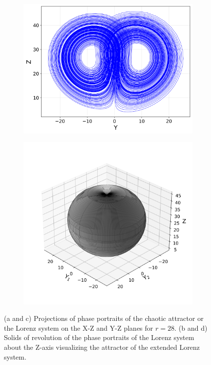 \documentclass[paper=a4, fontsize=11pt]{scrartcl}
\numberwithin{equation}{section}		%
\numberwithin{figure}{section}			%
\numberwithin{table}{section}				%
\begin{document}
\begin{figure}[hbt!]
\begin{subfigure}[b]{0.495\textwidth}
		\caption{}
		\label{fig:sub2}
	\end{subfigure}
	\hfill
	\begin{subfigure}[b]{0.495\textwidth}
		\centering
		\includegraphics[width=\textwidth]{media/lorenz_yz_projection.png}
		\caption{}
		\label{fig:sub1}
	\end{subfigure}
	\hfill
	\begin{subfigure}[b]{0.495\textwidth}
		\centering
		\includegraphics[width=\textwidth]{media/lorenz_y_surface_of_revolution.png}
		\caption{}
		\label{fig:sub2}
	\end{subfigure}
	
	\caption{(a and c) Projections of phase portraits of the chaotic attractor or the Lorenz system on the X-Z and Y-Z planes for $r = 28$. (b and d) Solids of revolution of the phase portraits of the Lorenz system about the Z-axis visualizing the attractor of the extended Lorenz system.}
	\label{fig:extendedattractor}
\end{figure}
	
\end{document}

